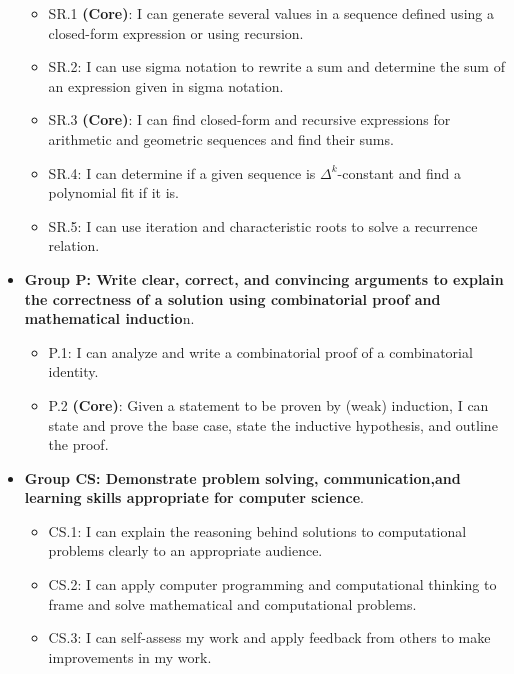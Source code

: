 \documentclass[]{article}
\providecommand{\tightlist}{%
  \setlength{\itemsep}{0pt}\setlength{\parskip}{0pt}}
\begin{document}
\begin{itemize}
  \begin{itemize}
  \tightlist
  \item
    SR.1 \textbf{(Core)}: I can generate several values in a sequence
    defined using a closed-form expression or using recursion.
  \item
    SR.2: I can use sigma notation to rewrite a sum and determine the
    sum of an expression given in sigma notation.
  \item
    SR.3 \textbf{(Core)}: I can find closed-form and recursive
    expressions for arithmetic and geometric sequences and find their
    sums.
  \item
    SR.4: I can determine if a given sequence is \(\Delta^k\)-constant
    and find a polynomial fit if it is.
  \item
    SR.5: I can use iteration and characteristic roots to solve a
    recurrence relation.
  \end{itemize}
\item
  \textbf{Group P: Write clear, correct, and convincing arguments to
  explain the correctness of a solution using combinatorial proof and
  mathematical inductio}n.

  \begin{itemize}
  \tightlist
  \item
    P.1: I can analyze and write a combinatorial proof of a
    combinatorial identity.
  \item
    P.2 \textbf{(Core)}: Given a statement to be proven by (weak)
    induction, I can state and prove the base case, state the inductive
    hypothesis, and outline the proof.
  \end{itemize}
\item
  \textbf{Group CS: Demonstrate problem solving, communication,and
  learning skills appropriate for computer science}.

  \begin{itemize}
  \tightlist
  \item
    CS.1: I can explain the reasoning behind solutions to computational
    problems clearly to an appropriate audience.
  \item
    CS.2: I can apply computer programming and computational thinking to
    frame and solve mathematical and computational problems.
  \item
    CS.3: I can self-assess my work and apply feedback from others to
    make improvements in my work.
  \end{itemize}
\end{itemize}
\end{document}
